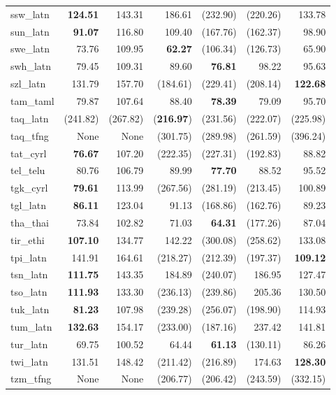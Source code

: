 \documentclass[11pt]{article}
\begin{document}
\begin{center}
\begin{longtable}[width=0.9\textwidth]{|l|rrrrrr|}
ssw\_latn & \textbf{124.51} & 143.31 & 186.61 & (232.90) & (220.26) & 133.78 \\ 
sun\_latn & \textbf{91.07} & 116.80 & 109.40 & (167.76) & (162.37) & 98.90 \\ 
swe\_latn & 73.76 & 109.95 & \textbf{62.27} & (106.34) & (126.73) & 65.90 \\ 
swh\_latn & 79.45 & 109.31 & 89.60 & \textbf{76.81} & 98.22 & 95.63 \\ 
szl\_latn & 131.79 & 157.70 & (184.61) & (229.41) & (208.14) & \textbf{122.68} \\ 
tam\_taml & 79.87 & 107.64 & 88.40 & \textbf{78.39} & 79.09 & 95.70 \\ 
taq\_latn & (241.82) & (267.82) & (\textbf{216.97}) & (231.56) & (222.07) & (225.98) \\ 
taq\_tfng & None & None & (301.75) & (289.98) & (261.59) & (396.24) \\ 
tat\_cyrl & \textbf{76.67} & 107.20 & (222.35) & (227.31) & (192.83) & 88.82 \\ 
tel\_telu & 80.76 & 106.79 & 89.99 & \textbf{77.70} & 88.52 & 95.52 \\ 
tgk\_cyrl & \textbf{79.61} & 113.99 & (267.56) & (281.19) & (213.45) & 100.89 \\ 
tgl\_latn & \textbf{86.11} & 123.04 & 91.13 & (168.86) & (162.76) & 89.23 \\ 
tha\_thai & 73.84 & 102.82 & 71.03 & \textbf{64.31} & (177.26) & 87.04 \\ 
tir\_ethi & \textbf{107.10} & 134.77 & 142.22 & (300.08) & (258.62) & 133.08 \\ 
tpi\_latn & 141.91 & 164.61 & (218.27) & (212.39) & (197.37) & \textbf{109.12} \\ 
tsn\_latn & \textbf{111.75} & 143.35 & 184.89 & (240.07) & 186.95 & 127.47 \\ 
tso\_latn & \textbf{111.93} & 133.30 & (236.13) & (239.86) & 205.36 & 130.50 \\ 
tuk\_latn & \textbf{81.23} & 107.98 & (239.28) & (256.07) & (198.90) & 114.93 \\ 
tum\_latn & \textbf{132.63} & 154.17 & (233.00) & (187.16) & 237.42 & 141.81 \\ 
tur\_latn & 69.75 & 100.52 & 64.44 & \textbf{61.13} & (130.11) & 86.26 \\ 
twi\_latn & 131.51 & 148.42 & (211.42) & (216.89) & 174.63 & \textbf{128.30} \\ 
tzm\_tfng & None & None & (206.77) & (206.42) & (243.59) & (332.15) \\ 

\end{longtable}
\end{center}
\end{document}
